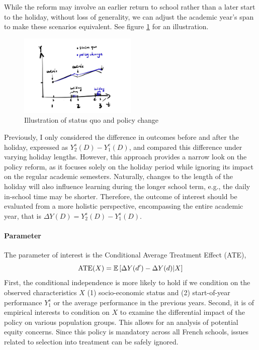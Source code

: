 \documentclass[12pt]{article}
\begin{document}
While the reform may involve an earlier return to school rather than a later
start to the holiday, without loss of generality, we can adjust the academic
year's span to make these scenarios equivalent. See figure \ref{fig:drawing}
for an illustration.

\begin{figure}
    \centering
    \includegraphics[width=0.5\textwidth]{../Figures/drawing_2.jpg}
    \caption{Illustration of status quo and policy change}
    \label{fig:drawing}
\end{figure}

Previously, I only considered the difference in outcomes before and after the
holiday, expressed as $Y^s_2(D) - Y^e_1(D)$, and compared this difference under
varying holiday lengths. However, this approach provides a narrow look on the
policy reform, as it focuses solely on the holiday period while ignoring its
impact on the regular academic semesters. Naturally, changes to the length of
the holiday will also influence learning during the longer school term, e.g.,
the daily in-school time may be shorter. Therefore, the outcome of interest
should be evaluated from a more holistic perspective, encompassing the entire
academic year, that is $\Delta Y(D)=Y^s_2(D) - Y^s_1(D)$.

\paragraph{Parameter}
The parameter of interest is the Conditional Average Treatment Effect (ATE),
\begin{equation*}
    \text{ATE}(X)=\mathbb{E}\left[\Delta Y(d')-\Delta Y(d)|X\right]
\end{equation*}
First, the conditional independence is more likely to hold if we condition on the observed characteristics $X$ (1) socio-economic status and (2) start-of-year performance $Y^s_1$ or the average performance in the previous years. Second, it is of empirical interests to condition on $X$ to examine the
differential impact of the policy on various population groups. This allows for
an analysis of potential equity concerns. Since this policy is mandatory across
all French schools, issues related to selection into treatment can be safely
ignored.
\end{document}
